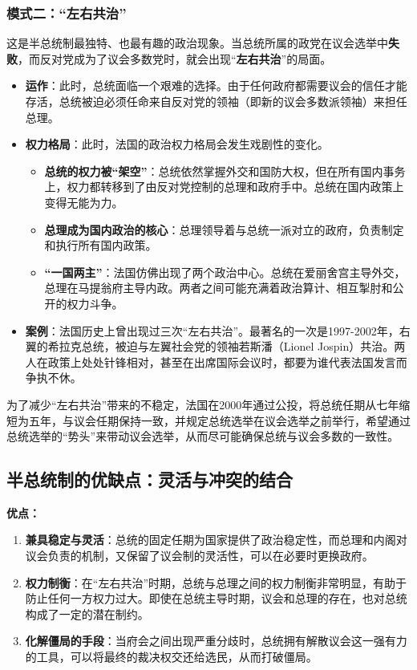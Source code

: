 \subsubsection*{模式二：“左右共治”}

这是半总统制最独特、也最有趣的政治现象。当总统所属的政党在议会选举中\textbf{失败}，而反对党成为了议会多数党时，就会出现“\textbf{左右共治}”的局面。
\begin{itemize}
    \item \textbf{运作}：此时，总统面临一个艰难的选择。由于任何政府都需要议会的信任才能存活，总统被迫必须任命来自反对党的领袖（即新的议会多数派领袖）来担任总理。
    \item \textbf{权力格局}：此时，法国的政治权力格局会发生戏剧性的变化。
    \begin{itemize}
        \item \textbf{总统的权力被“架空”}：总统依然掌握外交和国防大权，但在所有国内事务上，权力都转移到了由反对党控制的总理和政府手中。总统在国内政策上变得无能为力。
        \item \textbf{总理成为国内政治的核心}：总理领导着与总统一派对立的政府，负责制定和执行所有国内政策。
        \item \textbf{“一国两主”}：法国仿佛出现了两个政治中心。总统在爱丽舍宫主导外交，总理在马提翁府主导内政。两者之间可能充满着政治算计、相互掣肘和公开的权力斗争。
    \end{itemize}
    \item \textbf{案例}：法国历史上曾出现过三次“左右共治”。最著名的一次是1997-2002年，右翼的希拉克总统，被迫与左翼社会党的领袖若斯潘（Lionel Jospin）共治。两人在政策上处处针锋相对，甚至在出席国际会议时，都要为谁代表法国发言而争执不休。
\end{itemize}

为了减少“左右共治”带来的不稳定，法国在2000年通过公投，将总统任期从七年缩短为五年，与议会任期保持一致，并规定总统选举在议会选举之前举行，希望通过总统选举的“势头”来带动议会选举，从而尽可能确保总统与议会多数的一致性。

\subsection{半总统制的优缺点：灵活与冲突的结合}

\textbf{优点：}

\begin{enumerate}
    \item \textbf{兼具稳定与灵活}：总统的固定任期为国家提供了政治稳定性，而总理和内阁对议会负责的机制，又保留了议会制的灵活性，可以在必要时更换政府。
    \item \textbf{权力制衡}：在“左右共治”时期，总统与总理之间的权力制衡非常明显，有助于防止任何一方权力过大。即使在总统主导时期，议会和总理的存在，也对总统构成了一定的潜在制约。
    \item \textbf{化解僵局的手段}：当府会之间出现严重分歧时，总统拥有解散议会这一强有力的工具，可以将最终的裁决权交还给选民，从而打破僵局。
\end{enumerate}

